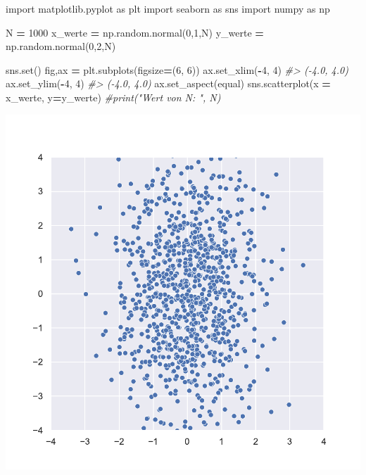 \documentclass[
]{book}
\newenvironment{Shaded}{\begin{snugshade}}{\end{snugshade}}
\newcommand{\BuiltInTok}[1]{#1}
\newcommand{\CommentTok}[1]{\textcolor[rgb]{0.56,0.35,0.01}{\textit{#1}}}
\newcommand{\DecValTok}[1]{\textcolor[rgb]{0.00,0.00,0.81}{#1}}
\newcommand{\ImportTok}[1]{#1}
\newcommand{\NormalTok}[1]{#1}
\newcommand{\OperatorTok}[1]{\textcolor[rgb]{0.81,0.36,0.00}{\textbf{#1}}}
\newcommand{\StringTok}[1]{\textcolor[rgb]{0.31,0.60,0.02}{#1}}
\theoremstyle{definition}
\theoremstyle{definition}
\theoremstyle{definition}
\theoremstyle{definition}
\theoremstyle{remark}
\begin{document}
\begin{Shaded}
\begin{Highlighting}[]
\ImportTok{import}\NormalTok{ matplotlib.pyplot }\ImportTok{as}\NormalTok{ plt}
\ImportTok{import}\NormalTok{ seaborn }\ImportTok{as}\NormalTok{ sns}
\ImportTok{import}\NormalTok{ numpy }\ImportTok{as}\NormalTok{ np}

\NormalTok{N }\OperatorTok{=} \DecValTok{1000}
\NormalTok{x\_werte }\OperatorTok{=}\NormalTok{ np.random.normal(}\DecValTok{0}\NormalTok{,}\DecValTok{1}\NormalTok{,N)}
\NormalTok{y\_werte }\OperatorTok{=}\NormalTok{ np.random.normal(}\DecValTok{0}\NormalTok{,}\DecValTok{2}\NormalTok{,N)}

\NormalTok{sns.}\BuiltInTok{set}\NormalTok{()}
\NormalTok{fig,ax }\OperatorTok{=}\NormalTok{ plt.subplots(figsize}\OperatorTok{=}\NormalTok{(}\DecValTok{6}\NormalTok{, }\DecValTok{6}\NormalTok{))}
\NormalTok{ax.set\_xlim(}\OperatorTok{{-}}\DecValTok{4}\NormalTok{, }\DecValTok{4}\NormalTok{)}
\CommentTok{\#\textgreater{} ({-}4.0, 4.0)}
\NormalTok{ax.set\_ylim(}\OperatorTok{{-}}\DecValTok{4}\NormalTok{, }\DecValTok{4}\NormalTok{)}
\CommentTok{\#\textgreater{} ({-}4.0, 4.0)}
\NormalTok{ax.set\_aspect(}\StringTok{\textquotesingle{}equal\textquotesingle{}}\NormalTok{)}
\NormalTok{sns.scatterplot(x }\OperatorTok{=}\NormalTok{ x\_werte, y}\OperatorTok{=}\NormalTok{y\_werte)}
\CommentTok{\#print("Wert von N: ", N)}
\end{Highlighting}
\end{Shaded}

\includegraphics{index_files/figure-latex/unnamed-chunk-2-3.pdf}
\end{document}
